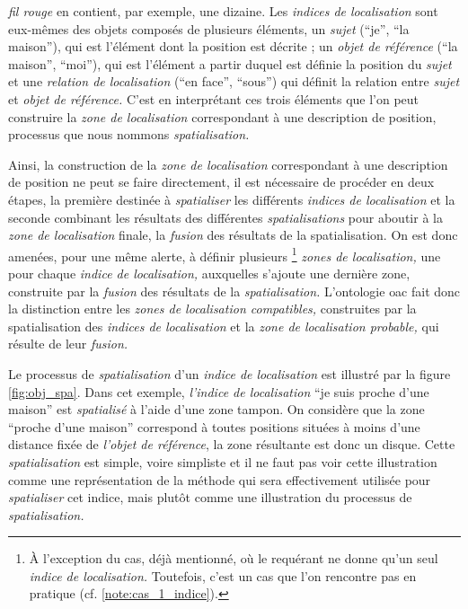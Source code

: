 \emph{fil rouge} en contient, par exemple, une dizaine.
% 
Les \emph{indices de localisation} sont eux-mêmes des objets composés
de plusieurs éléments, un \emph{sujet} (\enquote{je}, \enquote{la
  maison}), qui est l'élément dont la position est décrite ; un
\emph{objet de référence} (\enquote{la maison}, \enquote{moi}), qui
est l'élément a partir duquel est définie la position du \emph{sujet}
et une \emph{relation de localisation} (\enquote{en face},
\enquote{sous}) qui définit la relation entre \emph{sujet} et
\emph{objet de référence.} C'est en interprétant ces trois éléments
que l'on peut construire la \emph{zone de localisation} correspondant
à une description de position, processus que nous nommons
\emph{spatialisation.}

Ainsi, la construction de la \emph{zone de localisation} correspondant
à une description de position ne peut se faire directement, il est
nécessaire de procéder en deux étapes, la première destinée à
\emph{spatialiser} les différents \emph{indices de localisation} et la
seconde combinant les résultats des différentes \emph{spatialisations}
pour aboutir à la \emph{zone de localisation} finale, \ie la
\emph{fusion} des résultats de la spatialisation. On est donc amenées,
pour une même alerte, à définir plusieurs \footnote{À l'exception du
  cas, déjà mentionné, où le requérant ne donne qu'un seul
  \emph{indice de localisation.}  Toutefois, c'est un cas que l'on
  rencontre pas en pratique (cf. \autoref{note:cas_1_indice}).}
\emph{zones de localisation,} une pour chaque \emph{indice de
  localisation,} auxquelles s'ajoute une dernière zone, construite par
la \emph{fusion} des résultats de la \emph{spatialisation.}
L'ontologie \ac{oac} \autocite{Viry2019} fait donc la distinction
entre les \emph{zones de localisation compatibles,} construites par la
spatialisation des \emph{indices de localisation} et la \emph{zone de
  localisation probable,} qui résulte de leur \emph{fusion.}

Le processus de \emph{spatialisation} d'un \emph{indice de
  localisation} est illustré par la figure \ref{fig:obj_spa}. Dans cet
exemple, \emph{l'indice de localisation} \enquote{je suis proche d'une
  maison} est \emph{spatialisé} à l'aide d'une zone tampon. On
considère que la zone \enquote{proche d'une maison} correspond à
toutes positions situées à moins d'une distance fixée de \emph{l'objet
  de référence}, la zone résultante est donc un disque. Cette
\emph{spatialisation} est simple, voire simpliste et il ne faut pas
voir cette illustration comme une représentation de la méthode qui
sera effectivement utilisée pour \emph{spatialiser} cet indice, mais
plutôt comme une illustration du processus de \emph{spatialisation.}

